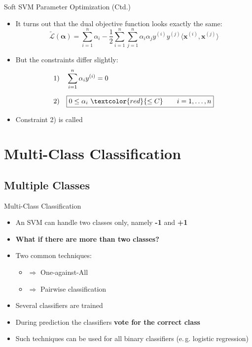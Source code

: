 \begin{frame}{Soft SVM Parameter Optimization (Ctd.)}{}
	\begin{itemize}
		\item It turns out that the dual objective function looks exactly the same:
		\begin{equation}
			\widetilde{\mathcal{L}}(\bm{\alpha}) =
				\sum_{i=1}^n \alpha_i - \frac{1}{2} \sum_{i=1}^n \sum_{j=1}^n
				\alpha_i \alpha_j y^{(i)} y^{(j)} \langle \bm{x}^{(i)}, \bm{x}^{(j)} \rangle
		\end{equation}
		\item But the constraints differ slightly:
		\footnotesize
		\begin{align}
			&1) \quad \sum_{i=1}^n \alpha_i y^{(i)} = 0 \\[2mm]
			&2) \quad \boxed{0 \le \alpha_i\ \textcolor{red}{\le C} \qquad i = 1, \dots, n} 
		\end{align}
		\normalsize
		\item Constraint 2) is called 
	\end{itemize}
\end{frame}


\section{Multi-Class Classification}

\subsection{Multiple Classes}

\begin{frame}{Multi-Class Classification}{}
	\begin{itemize}
		\item An SVM can handle two classes only, namely \textbf{-1} and \textbf{+1}
		\item \textbf{What if there are more than two classes?}
		\item Two common techniques:
		\begin{itemize}
			\item {} 	$\Rightarrow$ One-against-All
			\item {} 	$\Rightarrow$ Pairwise classification
		\end{itemize}
		\item Several classifiers are trained
		\item During prediction the classifiers \textbf{vote for the correct class}
		\item Such techniques can be used for all binary classifiers (e.\,g. logistic regression)
	\end{itemize}
\end{frame}


